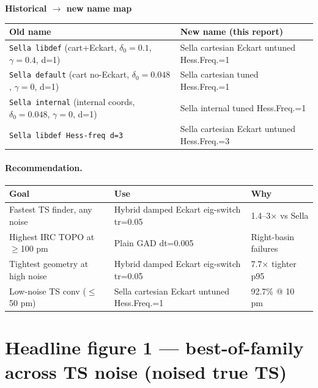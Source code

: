 \documentclass[11pt]{article}
\begin{document}
\begin{center}\footnotesize
\textbf{Historical $\to$ new name map}\\[0.3em]
\begin{tabular}{l|l}
\toprule
\textbf{Old name} & \textbf{New name (this report)} \\
\midrule
\texttt{Sella libdef} (cart+Eckart, $\delta_0{=}0.1$, $\gamma{=}0.4$, d=1) & Sella cartesian Eckart untuned Hess.Freq.=1 \\
\texttt{Sella default} (cart no-Eckart, $\delta_0{=}0.048$, $\gamma{=}0$, d=1) & Sella cartesian tuned Hess.Freq.=1 \\
\texttt{Sella internal} (internal coords, $\delta_0{=}0.048$, $\gamma{=}0$, d=1) & Sella internal tuned Hess.Freq.=1 \\
\texttt{Sella libdef Hess-freq d=3} & Sella cartesian Eckart untuned Hess.Freq.=3 \\
\bottomrule
\end{tabular}
\end{center}

\paragraph{Recommendation.}
\begin{center}\small
\begin{tabular}{p{}|p{}|p{}}
\toprule
\textbf{Goal} & \textbf{Use} & \textbf{Why} \\
\midrule
Fastest TS finder, any noise & Hybrid damped Eckart eig-switch tr=0.05 & 1.4--3$\times$ vs Sella \\
Highest IRC TOPO at $\ge$100 pm & Plain GAD dt=0.005 & Right-basin failures \\
Tightest geometry at high noise & Hybrid damped Eckart eig-switch tr=0.05 & 7.7$\times$ tighter p95 \\
Low-noise TS conv ($\le$50 pm) & Sella cartesian Eckart untuned Hess.Freq.=1 & 92.7\% @ 10 pm \\
\bottomrule
\end{tabular}
\end{center}

\clearpage
\section{Headline figure 1 — best-of-family across TS noise (noised true TS)}
\end{document}
